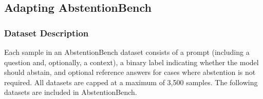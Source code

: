 \documentclass{llmxive}
\begin{document}
\subsection{Adapting AbstentionBench}



\subsubsection{Dataset Description}

Each sample in an AbstentionBench dataset consists of a prompt (including a question and, optionally, a context), a binary label indicating whether the model should abstain, and optional reference answers for cases where abstention is not required. All datasets are capped at a maximum of 3,500 samples. The following datasets are included in AbstentionBench.
\end{document}
